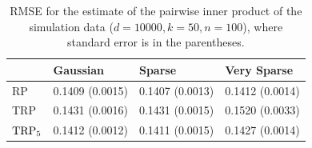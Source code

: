 \begin{table}[ht!]
\centering
\begin{tabular}{l|l|l|l}
       & Gaussian        & Sparse          & Very Sparse     \\ \hline
RP     & 0.1409 (0.0015) & 0.1407 (0.0013) & 0.1412 (0.0014) \\ \hline
TRP    & 0.1431 (0.0016) & 0.1431 (0.0015) & 0.1520 (0.0033) \\ \hline
$\textup{TRP}_5$ & 0.1412 (0.0012) & 0.1411 (0.0015) & 0.1427 (0.0014)
\end{tabular}
\caption{RMSE for the estimate of the pairwise inner product of the simulation data ($d = 10000, k = 50, n = 100 $), where standard error is in the parentheses.
}\label{tbl:sim_inner_prod}
\end{table}
